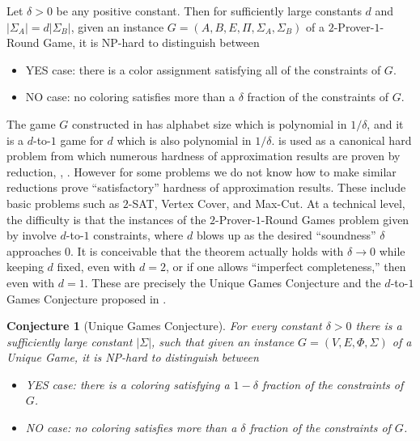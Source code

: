 \documentclass{toc}
\newtheorem{rconj}[theorem]{Conjecture}
\newcommand\card[1]{\left| {#1} \right|}
\begin{document}
\begin{theorem}\label{thm:pcp+raz}
Let $\delta>0$ be any positive constant. Then for sufficiently large constants $d$
  and  $|\Sigma_A| = d\card{\Sigma_B}$,
given an instance $G=(A,B,E,\Pi,\Sigma_A,\Sigma_B)$ of a $2$-Prover-$1$-Round Game, it is NP-hard
to distinguish between
\begin{itemize}
\item YES case: there is a color assignment  satisfying all of the constraints of $G$.
\item NO case: no coloring satisfies more
than a %
$\delta$ fraction of the constraints of $G$.
\end{itemize}
\end{theorem}

The game $G$ constructed in  has alphabet size which is polynomial in $1/\delta$,
and it is a $d$-to-$1$ game for $d$ which is also polynomial in $1/\delta$.
 is used as a canonical hard problem from
which numerous hardness of approximation results are proven by reduction, \eg, \cite{ABSS, BGS,
Has99,Has01,GHS00,DS05}.
However for some problems we do not know how
to make similar reductions prove ``satisfactory'' hardness of
approximation results. These include basic problems such
as $2$-SAT, Vertex Cover, and Max-Cut. At a technical level, the difficulty is that the instances of the $2$-Prover-$1$-Round Games problem
given by  involve $d$-to-$1$ constraints,
where $d$ blows up as the desired ``soundness'' $\delta$ approaches $0$. It
is conceivable that the theorem actually holds with $\delta \to 0$ while keeping $d$ fixed, even with $d=2$, or if one allows ``imperfect
completeness,'' then even with $d=1$. These are precisely the Unique Games Conjecture and the $d$-to-$1$ Games Conjecture proposed in \cite{Khot02}.

\begin{rconj} [Unique Games Conjecture]\label{conj:ugc}
For every constant $\delta>0$ there is a sufficiently large constant
$|\Sigma|$, such that  given an instance $G=(V,E,\Phi,\Sigma)$ of a Unique Game, it is NP-hard
to distinguish between
\begin{itemize}
\item YES case: there is a coloring satisfying
a %
$1-\delta$ fraction of the constraints of $G$.
\item NO case: no coloring satisfies more than
a %
$\delta$ fraction of the constraints of $G$.
\end{itemize}
\end{rconj}
\end{document}

